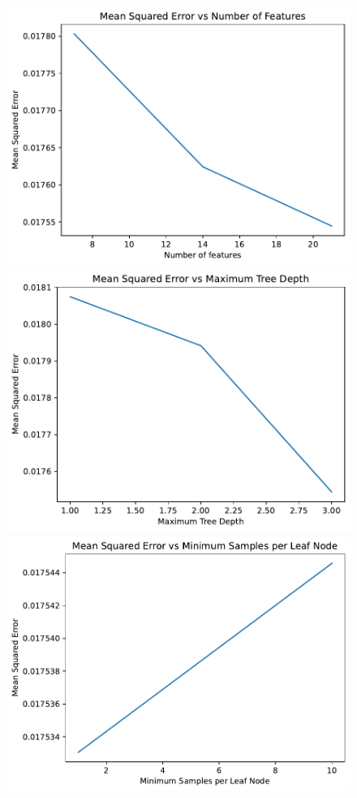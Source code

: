 \documentclass[hidelinks,12pt]{article}
\begin{document}
\subsubsection{}
\begin{figure}[htbp]
    \centering
    \includegraphics[width=.75\textwidth]{out/6_3_1.pdf}
    \includegraphics[width=.75\textwidth]{out/6_3_2.pdf}
    \includegraphics[width=.75\textwidth]{out/6_3_3.pdf}
\end{figure}
\end{document}
